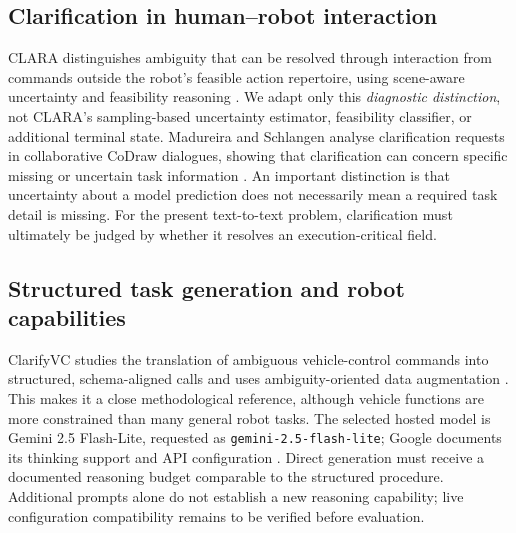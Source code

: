 \documentclass[10pt,conference]{IEEEtran}
\begin{document}
\subsection{Clarification in human--robot interaction}
CLARA distinguishes ambiguity that can be resolved through interaction from commands outside the robot's feasible action repertoire, using scene-aware uncertainty and feasibility reasoning \cite{clara}. We adapt only this \emph{diagnostic distinction}, not CLARA's sampling-based uncertainty estimator, feasibility classifier, or additional terminal state. Madureira and Schlangen analyse clarification requests in collaborative CoDraw dialogues, showing that clarification can concern specific missing or uncertain task information \cite{codraw}. An important distinction is that uncertainty about a model prediction does not necessarily mean a required task detail is missing. For the present text-to-text problem, clarification must ultimately be judged by whether it resolves an execution-critical field.

\subsection{Structured task generation and robot capabilities}
ClarifyVC studies the translation of ambiguous vehicle-control commands into structured, schema-aligned calls and uses ambiguity-oriented data augmentation \cite{clarifyvc}. This makes it a close methodological reference, although vehicle functions are more constrained than many general robot tasks. The selected hosted model is Gemini 2.5 Flash-Lite, requested as \texttt{gemini-2.5-flash-lite}; Google documents its thinking support and API configuration \cite{geminimodel,geminithinking}. Direct generation must receive a documented reasoning budget comparable to the structured procedure. Additional prompts alone do not establish a new reasoning capability; live configuration compatibility remains to be verified before evaluation.
\end{document}
